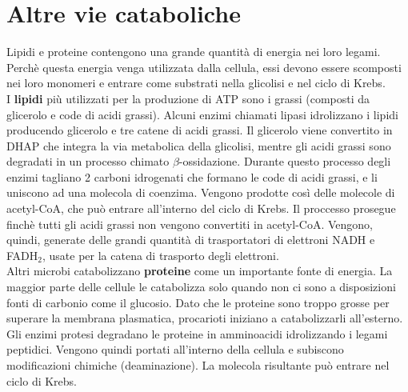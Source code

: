 \section{Altre vie cataboliche}
Lipidi e proteine contengono una grande quantit\`a di energia nei loro legami. Perch\`e questa energia venga utilizzata dalla cellula, essi devono essere scomposti nei loro monomeri e entrare come substrati nella glicolisi e nel ciclo di Krebs.
\\I \textbf{lipidi} pi\`u utilizzati per la produzione di ATP sono i grassi (composti da glicerolo e code di acidi grassi). Alcuni enzimi chiamati lipasi idrolizzano i lipidi producendo glicerolo e tre catene di acidi grassi. Il glicerolo viene convertito in DHAP che integra la via metabolica della glicolisi, mentre gli acidi grassi sono degradati in un processo chimato $\beta$-ossidazione. 
Durante questo processo degli enzimi tagliano 2 carboni idrogenati che formano le code di acidi grassi, e li uniscono ad una molecola di coenzima. Vengono prodotte cos\`i delle molecole di acetyl-CoA, che pu\`o entrare all'interno del ciclo di Krebs. Il proccesso prosegue finch\`e tutti gli acidi grassi non vengono convertiti in acetyl-CoA. Vengono, quindi, generate delle grandi quantit\`a di trasportatori di elettroni NADH e FADH$_2$, usate per la catena di trasporto degli elettroni.
\\Altri microbi catabolizzano \textbf{proteine} come un importante fonte di energia. La maggior parte delle cellule le catabolizza solo quando non ci sono a disposizioni fonti di carbonio come il glucosio. Dato che le proteine sono troppo grosse per superare la membrana plasmatica, procarioti iniziano a catabolizzarli all'esterno. Gli enzimi protesi degradano le proteine in amminoacidi idrolizzando i legami peptidici. Vengono quindi portati all'interno della cellula e subiscono modificazioni chimiche (deaminazione). La molecola risultante pu\`o entrare nel ciclo di Krebs.
